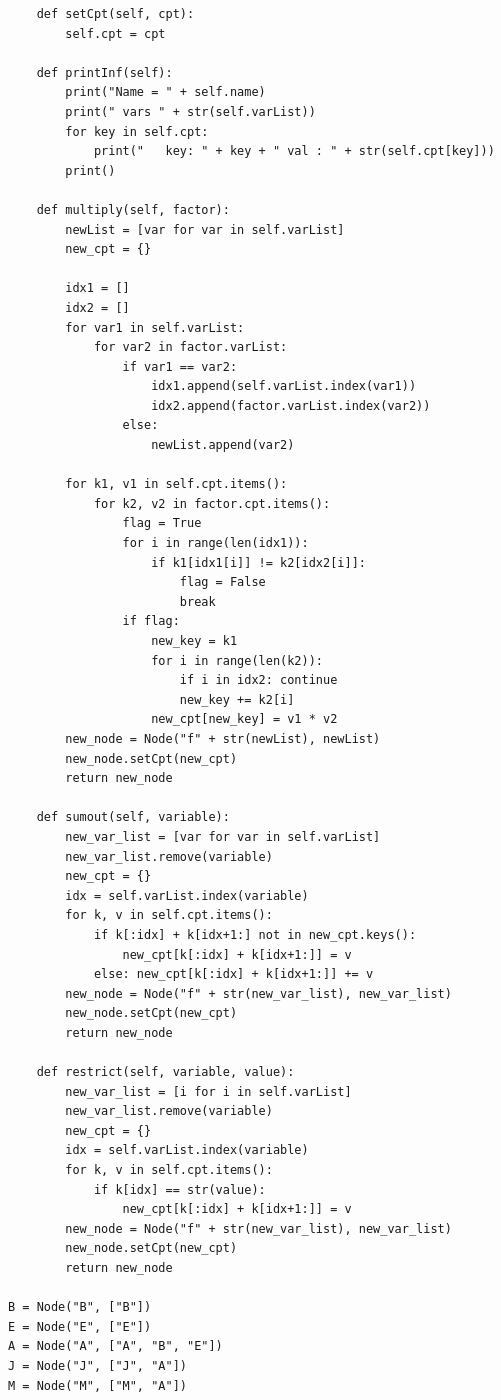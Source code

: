 \documentclass[a4paper, 11pt]{article}
\begin{document}
\begin{lstlisting}
    def setCpt(self, cpt):
        self.cpt = cpt

    def printInf(self):
        print("Name = " + self.name)
        print(" vars " + str(self.varList))
        for key in self.cpt:
            print("   key: " + key + " val : " + str(self.cpt[key]))
        print()

    def multiply(self, factor):
        newList = [var for var in self.varList]
        new_cpt = {}
        
        idx1 = []
        idx2 = []
        for var1 in self.varList:
            for var2 in factor.varList:
                if var1 == var2:
                    idx1.append(self.varList.index(var1))
                    idx2.append(factor.varList.index(var2))
                else:
                    newList.append(var2)

        for k1, v1 in self.cpt.items():
            for k2, v2 in factor.cpt.items():
                flag = True
                for i in range(len(idx1)):
                    if k1[idx1[i]] != k2[idx2[i]]:
                        flag = False
                        break
                if flag:
                    new_key = k1
                    for i in range(len(k2)):
                        if i in idx2: continue
                        new_key += k2[i]
                    new_cpt[new_key] = v1 * v2
        new_node = Node("f" + str(newList), newList)
        new_node.setCpt(new_cpt)
        return new_node

    def sumout(self, variable):
        new_var_list = [var for var in self.varList]
        new_var_list.remove(variable)
        new_cpt = {}
        idx = self.varList.index(variable)
        for k, v in self.cpt.items():
            if k[:idx] + k[idx+1:] not in new_cpt.keys():
                new_cpt[k[:idx] + k[idx+1:]] = v
            else: new_cpt[k[:idx] + k[idx+1:]] += v
        new_node = Node("f" + str(new_var_list), new_var_list)
        new_node.setCpt(new_cpt)
        return new_node

    def restrict(self, variable, value):
        new_var_list = [i for i in self.varList]
        new_var_list.remove(variable)
        new_cpt = {}
        idx = self.varList.index(variable)
        for k, v in self.cpt.items():
            if k[idx] == str(value):
                new_cpt[k[:idx] + k[idx+1:]] = v
        new_node = Node("f" + str(new_var_list), new_var_list)
        new_node.setCpt(new_cpt)
        return new_node

B = Node("B", ["B"])
E = Node("E", ["E"])
A = Node("A", ["A", "B", "E"])
J = Node("J", ["J", "A"])
M = Node("M", ["M", "A"])


\end{lstlisting}
\end{document}
